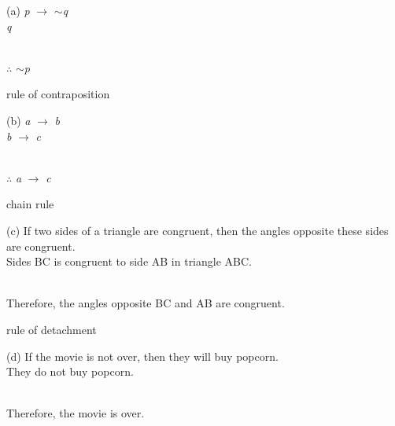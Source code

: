 \documentclass{article}
\begin{document}
\begin{itemize}
    (a) \emph{p} $\to$ $\sim$\emph{q}\\
    \hspace*{0.4cm} \emph{q}\\
    \\
    \hspace*{0.4cm} $\therefore$ $\sim$\emph{p}
    
    {\hspace*{0.4cm}\color{blue} rule of contraposition}
    
    (b) \emph{a} $\to$ \emph{b}\\
    \hspace*{0.5cm} \emph{b} $\to$ \emph{c}\\
    \\
    \hspace*{0.4cm} $\therefore$ \emph{a} $\to$ \emph{c}
    
    {\hspace*{0.4cm}\color{blue} chain rule}
    
    (c) If two sides of a triangle are congruent, then the angles opposite these sides are congruent.\\ 
    \hspace*{0.4cm} Sides BC is congruent to side AB in triangle ABC.\\
    \\
    \hspace*{0.4cm}Therefore, the angles opposite BC and AB are congruent.
    
    {\hspace*{0.4cm} \color{blue} rule of detachment}
    
    (d) If the movie is not over, then they will buy popcorn.\\
    \hspace*{0.4cm} They do not buy popcorn.\\
    \\
    \hspace*{0.4cm} Therefore, the movie is over.
    

\end{itemize}
\end{document}
